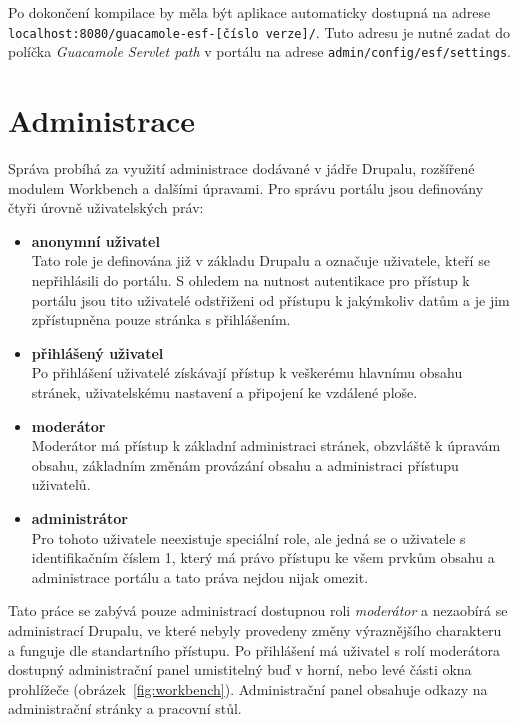 Po dokončení kompilace by měla být aplikace automaticky dostupná na adrese \texttt{localhost:8080/guacamole-esf-[číslo verze]/}. Tuto adresu je nutné zadat do políčka \emph{Guacamole Servlet path} v portálu na adrese \texttt{admin/config/esf/settings}.


\section{Administrace}
Správa probíhá za využití administrace dodávané v jádře Drupalu, rozšířené modulem Workbench a dalšími úpravami. Pro správu portálu jsou definovány čtyři úrovně uživatelských práv:

\begin{itemize}
  \item \textbf{anonymní uživatel} \hfill \\
    Tato role je definována již v základu Drupalu a označuje uživatele, kteří se nepřihlásili do portálu. S ohledem na nutnost autentikace pro přístup k portálu jsou tito uživatelé odstřiženi od přístupu k jakýmkoliv datům a je jim zpřístupněna pouze stránka s přihlášením.
  \item \textbf{přihlášený uživatel} \hfill \\
    Po přihlášení uživatelé získávají přístup k veškerému hlavnímu obsahu stránek, uživatelskému nastavení a připojení ke vzdálené ploše. 
  \item \textbf{moderátor} \hfill \\
    Moderátor má přístup k základní administraci stránek, obzvláště k úpravám obsahu, základním změnám provázání obsahu a administraci přístupu uživatelů.
  \item \textbf{administrátor} \hfill \\
    Pro tohoto uživatele neexistuje speciální role, ale jedná se o uživatele s identifikačním číslem 1, který má právo přístupu ke všem prvkům obsahu a administrace portálu a tato práva nejdou nijak omezit.
\end{itemize}

Tato práce se zabývá pouze administrací dostupnou roli \emph{moderátor} a nezaobírá se administrací Drupalu, ve které nebyly provedeny změny výraznějšího charakteru a funguje dle standartního přístupu. Po přihlášení má uživatel s rolí moderátora dostupný administrační panel umistitelný buď v horní, nebo levé části okna prohlížeče (obrázek~\ref{fig:workbench}). Administrační panel obsahuje odkazy na administrační stránky a pracovní stůl. 

